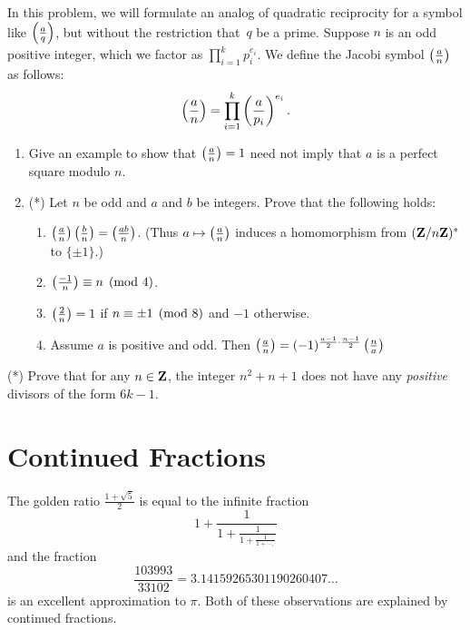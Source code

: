 \begin{exercises}
\item\label{ex:rec13} In this problem, we will formulate an analog of
  quadratic reciprocity for a symbol like $\left(\frac{a}{q}\right)$, but without the
  restriction that~$q$ be a prime.  Suppose $n$ is an odd positive integer,
  which we factor as $\prod_{i=1}^k p_i^{e_i}$.  We
  define the Jacobi symbol $\left(\frac{a}{n}\right)$ as follows:
  $$
  \left(\frac{a}{n}\right) = \prod_{i=1}^k \left(\frac{a}{p_i}\right)^{e_i}.
  $$
\begin{enumerate}
\item Give an example to show that $\left(\frac{a}{n}\right)=1$ need not imply that
  $a$ is a perfect square modulo $n$.
\item (*) Let $n$ be odd and $a$ and $b$ be integers.  Prove that the
  following holds:
\begin{enumerate}
\item $\left(\frac{a}{n}\right)\left(\frac{b}{n}\right) = \left(\frac{ab}{n}\right)$. (Thus $a\mapsto \left(\frac{a}{n}\right)$
  induces a homomorphism from $(\mathbf{Z}/n\mathbf{Z}{})^*$ to $\{\pm 1\}$.)
\item $\left(\frac{-1}{n}\right) \equiv n \pmod{4}$.
\item $\left(\frac{2}{n}\right)=1$ if $n\equiv \pm 1\pmod{8}$ and $-1$ otherwise.
\item Assume $a$ is positive and odd.  Then $\left(\frac{a}{n}\right) =
  (-1)^{\frac{a-1}{2} \cdot \frac{n-1}{2}} \left(\frac{n}{a}\right)$
\end{enumerate}
\end{enumerate}

\item\label{ex:rec14}(*) Prove that for any $n\in\mathbf{Z}$, the integer
  $n^2+n+1$ does not have any {\it positive} divisors of the form $6k-1$.

\end{exercises}



\chapter{Continued Fractions}\label{ch:contfrac}

The golden ratio
$\frac{1+\sqrt{5}}{2}$ is
equal to the infinite fraction
$$
1+ \frac{\displaystyle 1}{\displaystyle 1+ \frac{\displaystyle 1}{\displaystyle 1 +
\frac{1}{1 + \cdots,}}}
$$
and the fraction
$$
\frac{103993}{33102}=3.14159265301190260407\ldots
$$
is an excellent approximation to $\pi$.
Both of these observations are explained by continued fractions.

